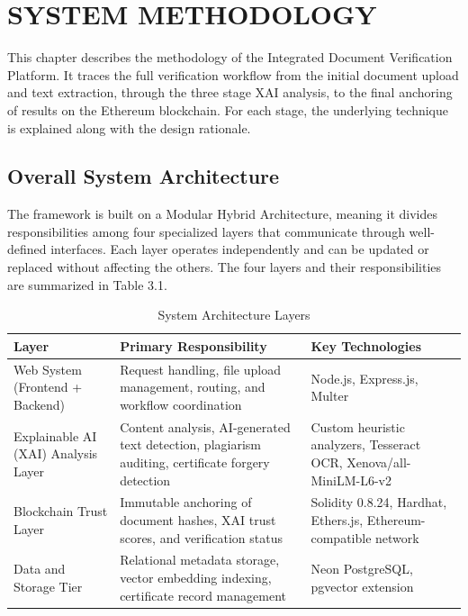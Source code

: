 \chapter{ \MakeUppercase{ SYSTEM METHODOLOGY}}\label{ch: method}


This chapter describes the methodology of the Integrated Document Verification Platform. It traces the full verification workflow from the initial document upload and text extraction, through the three stage XAI analysis, to the final anchoring of results on the Ethereum blockchain. For each stage, the underlying technique is explained along with the design rationale.

\section{Overall System Architecture}
\label{sec:system_architecture}
    The framework is built on a Modular Hybrid Architecture, meaning it divides responsibilities among four specialized layers that communicate through well-defined interfaces. Each layer operates independently and can be updated or replaced without affecting the others. The four layers and their responsibilities are summarized in Table 3.1.

    \begin{table}[htbp]
        \centering
        \caption{System Architecture Layers}
        \label{tab:system_architecture_layers}
        \renewcommand{\arraystretch}{1.4}
        
        \begin{tabular}{|p{3.5cm}|p{7cm}|p{4.5cm}|}
        \hline
        \textbf{Layer} & \textbf{Primary Responsibility} & \textbf{Key Technologies} \\
        \hline
        
        Web System (Frontend + Backend) &
        Request handling, file upload management, routing, and workflow coordination &
        Node.js, Express.js, Multer \\
        \hline
        
        Explainable AI (XAI) Analysis Layer &
        Content analysis, AI-generated text detection, plagiarism auditing, certificate forgery detection &
        Custom heuristic analyzers, Tesseract OCR, Xenova/all-MiniLM-L6-v2 \\
        \hline
        
        Blockchain Trust Layer &
        Immutable anchoring of document hashes, XAI trust scores, and verification status &
        Solidity 0.8.24, Hardhat, Ethers.js, Ethereum-compatible network \\
        \hline
        
        Data and Storage Tier &
        Relational metadata storage, vector embedding indexing, certificate record management &
        Neon PostgreSQL, pgvector extension \\
        \hline
        
        \end{tabular}
    \end{table}
    
